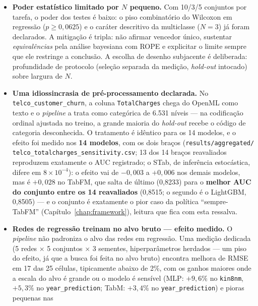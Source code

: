 \begin{itemize}
  \item \textbf{Poder estatístico limitado por $N$ pequeno.} Com 10/3/5
    conjuntos por tarefa, o poder dos testes é baixo: o piso combinatório do
    Wilcoxon em regressão ($p \ge 0{,}0625$) e o caráter descritivo da
    multiclasse ($N=3$) já foram declarados. A mitigação é tripla: não
    afirmar vencedor único, sustentar \emph{equivalências} pela análise
    bayesiana com ROPE e explicitar o limite sempre que ele restringe a conclusão. A escolha
    de desenho subjacente é deliberada: profundidade de protocolo
    (seleção separada da medição, \emph{hold-out} intocado) sobre largura de
    $N$.
  \item \textbf{Uma idiossincrasia de pré-processamento declarada.} No
    \texttt{telco\_\allowbreak customer\_\allowbreak churn}, a coluna \texttt{TotalCharges}
    chega do OpenML como texto e o \emph{pipeline} a trata como
    categórica de 6.531 níveis --- na codificação ordinal ajustada no
    treino, a grande maioria do \emph{hold-out} recebe o código de
    categoria desconhecida. O tratamento é idêntico para os 14
    modelos, e o efeito foi medido nos \textbf{14
    modelos}, com os dois braços
    (\texttt{results/\allowbreak aggregated/\allowbreak
    telco\_\allowbreak totalcharges\_\allowbreak sensitivity.csv};
    13 dos 14 braços reavaliados reproduzem exatamente o AUC
    registrado; o
    STab, de inferência estocástica, difere em $8\times10^{-4}$):
    o efeito vai de $-0{,}003$ a $+0{,}006$ nos demais modelos, mas é
    $+0{,}028$ no TabFM,
    que salta de último (0,8233) para o \textbf{melhor AUC do conjunto
    entre os 14 reavaliados} (0,8515; o segundo é o LightGBM, 0,8505)
    --- e o conjunto é
    exatamente o pior caso da política ``sempre-TabFM''
    (Capítulo~\ref{chap:framework}), leitura que fica com esta
    ressalva.
  \item \textbf{Redes de regressão treinam no alvo bruto --- efeito
    medido.} O \emph{pipeline} não padroniza o alvo das redes em
    regressão. Uma medição dedicada (5 redes $\times$ 5 conjuntos
    $\times$ 3 sementes, hiperparâmetros herdados --- um piso do
    efeito, já que a busca foi feita no alvo bruto) encontra melhora
    de RMSE em 17 das 25 células, tipicamente abaixo de 2\%, com os
    ganhos maiores onde a escala do alvo é grande ou o modelo é
    sensível (MLP: $+9{,}6\%$ no \texttt{kin8nm}, $+5{,}3\%$ no
    \texttt{year\_\allowbreak prediction}; TabM: $+3{,}4\%$ no
    \texttt{year\_\allowbreak prediction}) e pioras pequenas nas

\end{itemize}
